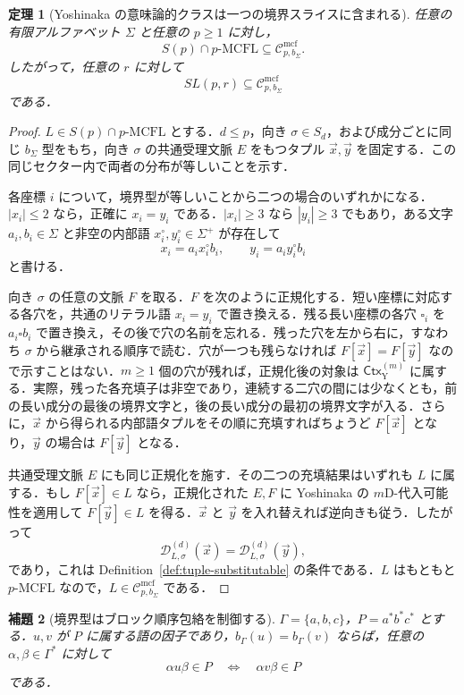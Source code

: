 \documentclass[11pt,a4paper]{ltjsarticle}
\numberwithin{equation}{section}
\theoremstyle{plain}
\newtheorem{theorem}{定理}[section]
\newtheorem{lemma}[theorem]{補題}
\theoremstyle{definition}
\theoremstyle{remark}
\newcommand{\Cmcf}[2]{\mathcal{C}^{\mathrm{mcf}}_{#1,#2}}
\newcommand{\D}{\mathcal{D}}
\newcommand{\tuple}[1]{\vec{#1}}
\newcommand{\blank}{\square}
\begin{document}
\begin{theorem}[Yoshinaka の意味論的クラスは一つの境界スライスに含まれる]
\label{thm:yoshinaka-inclusion}
任意の有限アルファベット \(\Sigma\) と任意の \(p\ge1\) に対し，
\[
  S(p)\cap p\text{-}\mathrm{MCFL}
  \subseteq
  \Cmcf{p}{b_\Sigma}.
\]
したがって，任意の \(r\) に対して
\[
  SL(p,r)\subseteq\Cmcf{p}{b_\Sigma}
\]
である．
\end{theorem}

\begin{proof}
\(L\in S(p)\cap p\text{-}\mathrm{MCFL}\) とする．\(d\le p\)，向き \(\sigma\in S_d\)，および成分ごとに同じ \(b_\Sigma\) 型をもち，向き \(\sigma\) の共通受理文脈 \(E\) をもつタプル \(\tuple x,\tuple y\) を固定する．この同じセクター内で両者の分布が等しいことを示す．

各座標 \(i\) について，境界型が等しいことから二つの場合のいずれかになる．\(|x_i|\le2\) なら，正確に \(x_i=y_i\) である．\(|x_i|\ge3\) なら \(|y_i|\ge3\) でもあり，ある文字 \(a_i,b_i\in\Sigma\) と非空の内部語 \(x_i^\circ,y_i^\circ\in\Sigma^+\) が存在して
\[
  x_i=a_i x_i^\circ b_i,
  \qquad
  y_i=a_i y_i^\circ b_i
\]
と書ける．

向き \(\sigma\) の任意の文脈 \(F\) を取る．\(F\) を次のように正規化する．短い座標に対応する各穴を，共通のリテラル語 \(x_i=y_i\) で置き換える．残る長い座標の各穴 \(\blank_i\) を \(a_i\blank b_i\) で置き換え，その後で穴の名前を忘れる．残った穴を左から右に，すなわち \(\sigma\) から継承される順序で読む．穴が一つも残らなければ \(F[\tuple x]=F[\tuple y]\) なので示すことはない．\(m\ge1\) 個の穴が残れば，正規化後の対象は \(\mathsf{Ctx}_{\mathrm Y}^{(m)}\) に属する．実際，残った各充填子は非空であり，連続する二穴の間には少なくとも，前の長い成分の最後の境界文字と，後の長い成分の最初の境界文字が入る．さらに，\(\tuple x\) から得られる内部語タプルをその順に充填すればちょうど \(F[\tuple x]\) となり，\(\tuple y\) の場合は \(F[\tuple y]\) となる．

共通受理文脈 \(E\) にも同じ正規化を施す．その二つの充填結果はいずれも \(L\) に属する．もし \(F[\tuple x]\in L\) なら，正規化された \(E,F\) に Yoshinaka の \(m\)D-代入可能性を適用して \(F[\tuple y]\in L\) を得る．\(\tuple x\) と \(\tuple y\) を入れ替えれば逆向きも従う．したがって
\[
  \D_{L,\sigma}^{(d)}(\tuple x)
  =\D_{L,\sigma}^{(d)}(\tuple y),
\]
であり，これは Definition~\ref{def:tuple-substitutable} の条件である．\(L\) はもともと \(p\)-MCFL なので，\(L\in\Cmcf{p}{b_\Sigma}\) である．
\end{proof}

\begin{lemma}[境界型はブロック順序包絡を制御する]
\label{lem:block-order-boundary-control}
$\Gamma=\{a,b,c\}$，$P=a^*b^*c^*$ とする．$u,v$ が $P$ に属する語の因子であり，$b_\Gamma(u)=b_\Gamma(v)$ ならば，任意の $\alpha,\beta\in\Gamma^*$ に対して
\[
  \alpha u\beta\in P
  \quad\Longleftrightarrow\quad
  \alpha v\beta\in P
\]
である．
\end{lemma}
\end{document}
